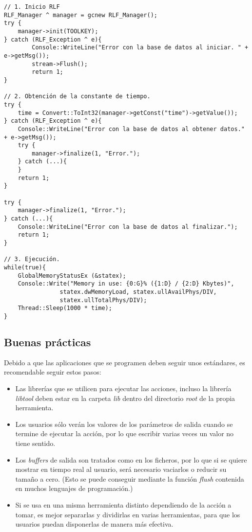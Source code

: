 \begin{verbatim}
// 1. Inicio RLF
RLF_Manager ^ manager = gcnew RLF_Manager();
try {
    manager->init(TOOLKEY);
} catch (RLF_Exception ^ e){
        Console::WriteLine("Error con la base de datos al iniciar. " + e->getMsg());
        stream->Flush();
        return 1;
}

// 2. Obtención de la constante de tiempo.
try {
    time = Convert::ToInt32(manager->getConst("time")->getValue());
} catch (RLF_Exception ^ e){
    Console::WriteLine("Error con la base de datos al obtener datos." + e->getMsg());
    try {
        manager->finalize(1, "Error.");
    } catch (...){
    }
    return 1;
}

try {
    manager->finalize(1, "Error.");
} catch (...){
    Console::WriteLine("Error con la base de datos al finalizar.");
    return 1;
}

// 3. Ejecución.
while(true){
    GlobalMemoryStatusEx (&statex);
    Console::Write("Memory in use: {0:G}% ({1:D} / {2:D} Kbytes)", 
                statex.dwMemoryLoad, statex.ullAvailPhys/DIV,
                statex.ullTotalPhys/DIV);
    Thread::Sleep(1000 * time);
}
\end{verbatim}


\subsection*{Buenas prácticas}
Debido a que las aplicaciones que se programen deben seguir unos 
estándares, es recomendable seguir estos pasos:

\begin{itemize}
\item Las librerías que se utilicen para ejecutar las acciones, 
incluso la librería \emph{libtool} deben estar en la carpeta 
\emph{lib} dentro del directorio \emph{root} de la propia herramienta.
\item Los usuarios sólo verán los valores de los parámetros de 
salida cuando se termine de ejecutar la acción, por lo que escribir 
varias veces un valor no tiene sentido.
\item Los \emph{buffers} de salida son tratados como en los ficheros, 
por lo que si se quiere mostrar en tiempo real al usuario, será 
necesario vaciarlos o reducir su tamaño a cero. (Esto se puede 
conseguir mediante la función \emph{flush} contenida en muchos 
lenguajes de programación.)
\item Si se usa en una misma herramienta distinto \hardware 
dependiendo de la acción a tomar, es mejor separarlas y dividirlas en 
varias herramientas, para que los usuarios puedan disponerlas de 
manera más efectiva.
\end{itemize}

